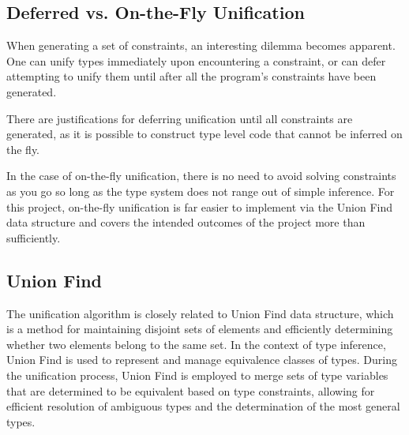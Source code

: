 \documentclass{l4proj}
\begin{document}
\subsection*{Deferred vs. On-the-Fly Unification}

When generating a set of constraints, an interesting dilemma becomes apparent.
One can unify types immediately upon encountering a constraint, or can defer attempting to unify them until after all the program's constraints have been generated.

There are justifications for deferring unification until all constraints are generated, as it is possible to construct type level code that cannot be inferred on the fly.

In the case of on-the-fly unification, there is no need to avoid solving constraints as you go so long as the type system does not range out of simple inference.
For this project, on-the-fly unification is far easier to implement via the Union Find data structure and covers the intended outcomes of the project more than sufficiently.





\subsection*{Union Find}
The unification algorithm is closely related to Union Find data structure, which is a method for maintaining disjoint sets of elements and efficiently determining whether two elements belong to the same set.
In the context of type inference, Union Find is used to represent and manage equivalence classes of types.
During the unification process, Union Find is employed to merge sets of type variables that are determined to be equivalent based on type constraints, allowing for efficient resolution of ambiguous types and the determination of the most general types.
\end{document}
